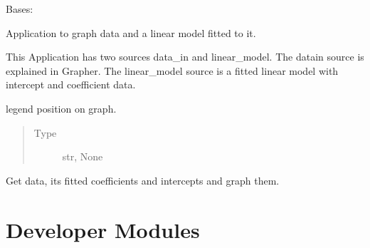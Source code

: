 \documentclass[letterpaper,10pt,english]{sphinxmanual}
\begin{document}
\begin{fulllineitems}
\label{\detokenize{dalio.application:dalio.application.LMGrapher}}
Bases: {\hyperref[\detokenize{dalio.application:dalio.application.graphers.PandasXYGrapher}]{}}

Application to graph data and a linear model fitted to it.

This Application has two sources data\_in and linear\_model. The data\sphinxhyphen{}in
source is explained in Grapher. The linear\_model source is a fitted
linear model with intercept and coefficient data.

\begin{fulllineitems}
\label{\detokenize{dalio.application:dalio.application.LMGrapher._legend}}
legend position on graph.
\begin{quote}\begin{description}
\item[{Type}] \leavevmode
str, None

\end{description}\end{quote}

\end{fulllineitems}


\begin{fulllineitems}
\label{\detokenize{dalio.application:dalio.application.LMGrapher.run}}
Get data, its fitted coefficients and intercepts and graph them.

\end{fulllineitems}


\end{fulllineitems}



\section{Developer Modules}
\label{\detokenize{modules:developer-modules}}
\end{document}
